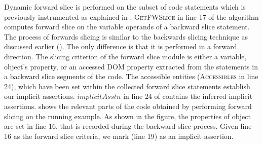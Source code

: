 Dynamic forward slice is performed on the subset of code statements which is previously instrumented as explained in . 
\textsc{GetFWSlice} in line 17 of the algorithm computes forward slice on the variable operands of a backward slice statement.
The process of forwards slicing is similar to the backwards slicing technique as discussed earlier (). The only difference is that it is performed in a forward direction. The slicing criterion of the forward slice module is either a variable, object's property, or an accessed DOM property extracted from the statements in a backward slice segments of the code. The accessible entities (\textsc{Accessibles} in line 24), which have been set within the collected forward slice statements establish our implicit assertions.
$implicitAsstn$ in line 24 of  contains the inferred implicit assertions.
 shows the relevant parts of the code obtained by performing forward slicing on the running example. 
As shown in the figure, the properties of object  are set in line 16, that is recorded during the backward slice process. Given line 16 as the forward slice criteria, we mark  (line 19) as an implicit assertion.        